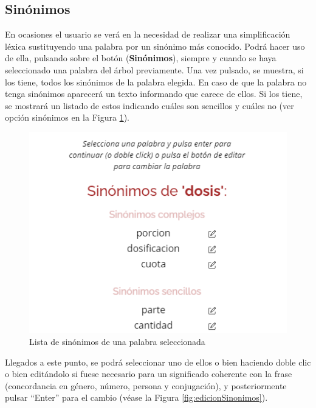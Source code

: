 \subsection{Sinónimos}
En ocasiones el usuario se verá en la necesidad de realizar una simplificación léxica sustituyendo una palabra por un sinónimo más conocido. Podrá hacer uso de ella, pulsando sobre el botón (\textbf{Sinónimos}), siempre y cuando se haya seleccionado una palabra del árbol previamente. Una vez pulsado, se muestra, si los tiene, todos los sinónimos de la palabra elegida. En caso de que la palabra no tenga sinónimos aparecerá un texto informando que carece de ellos. Si los tiene, se mostrará un listado de estos indicando cuáles son sencillos y cuáles no (ver opción sinónimos en la Figura \ref{fig:listaSinonimos}).

	 \begin{figure}[h!]
	\centering
	
	
	\includegraphics[scale=1.0]{Imagenes/Figuras/SinonimoPersona}
	
	
	\caption{Lista de sinónimos de una palabra seleccionada}
	\label{fig:listaSinonimos}
\end{figure}

 Llegados a este punto, se podrá seleccionar uno de ellos o bien haciendo doble clic o bien editándolo si fuese necesario para un significado coherente con la frase (concordancia en género, número, persona y conjugación), y posteriormente pulsar ``Enter'' para el cambio (véase la Figura \ref{fig:edicionSinonimos}).


